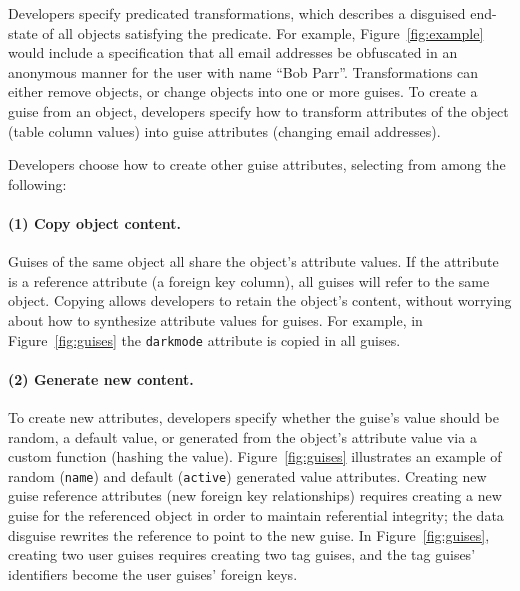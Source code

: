 Developers specify predicated transformations, which describes a disguised end-state of all
objects satisfying the predicate. For
example, Figure~\ref{fig:example} would include a specification that all email addresses be obfuscated in an anonymous manner for the user with name ``Bob Parr''.
%
Transformations can either remove objects, or change objects into one or more guises.
To create a guise from an object, developers specify how to transform attributes of the
object (\eg table column values) into guise attributes (\eg changing email addresses).

\iffalse
Developers choose how to create other guise attributes, selecting from among the following:
%
\paragraph{(1) Copy object content.}
%
Guises of the same object all share the object's attribute values.
%
If the attribute is a reference attribute (\eg a foreign key column), all guises will refer to the same object.
%
%
Copying allows developers to retain the object's content, without worrying about how to
synthesize attribute values for guises.
%
For example, in Figure~\ref{fig:guises} the \texttt{darkmode} attribute is copied in
all guises.

\paragraph{(2) Generate new content.}
%
To create new attributes, developers specify whether the guise's value should be random,
a default value, or generated from the object's attribute value via a custom function (\eg hashing
the value).
%
Figure~\ref{fig:guises} illustrates an example of random (\texttt{name}) and default
(\texttt{active}) generated value attributes.
%
%
Creating new guise reference attributes (\eg new foreign key relationships) requires
creating a new guise for the referenced object in order to maintain referential
integrity;
the data disguise rewrites the reference to point to the new guise.
%
In Figure~\ref{fig:guises}, creating two user guises requires creating two
tag guises, and the tag guises' identifiers become the user guises' foreign keys.
%

